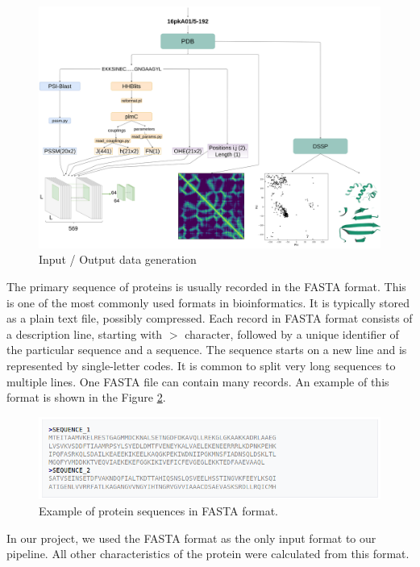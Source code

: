 \begin{figure}
    \centering
    \includegraphics[width=\linewidth]{imgs_tomas/pipeline_input.png}
    \caption{Input / Output data generation}
    \label{fig:pipeline_input}
\end{figure}

The primary sequence of proteins is usually recorded in the FASTA format.
This is one of the most commonly used formats in bioinformatics.
It is typically stored as a plain text file, possibly compressed. 
Each record in FASTA format consists of a description line, starting with $>$ character, followed by a unique identifier of the particular sequence and a sequence.
The sequence starts on a new line and is represented by single-letter codes.
It is common to split very long sequences to multiple lines.
One FASTA file can contain many records.
An example of this format is shown in the Figure \ref{fig:fasta}.

\begin{figure}[ht]
    \centering
    \includegraphics[width=\linewidth]{imgs_andy/fasta.png}
    \caption{Example of protein sequences in FASTA format.}
    \label{fig:fasta}
\end{figure}

In our project, we used the FASTA format as the only input format to our pipeline.
All other characteristics of the protein were calculated from this format.

